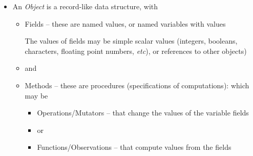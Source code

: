 \documentclass{ip3}
\begin{document}
\begin{foil}
\begin{itemize}
\item An \textit{Object} is a record-like data structure, with 
      \begin{itemize}
      \item Fields  -- these are named values, or named variables with values
            \begin{note}
                  The values of fields may be simple scalar values
                  (integers, booleans, characters, floating point numbers,
                  \textit{etc}), or references to other objects)
            \end{note}
      
      \item[]and  
      
      
      \item Methods -- these are procedures (specifications of computations): which may be 
           \begin{itemize}
           \item Operations/Mutators  -- that change the values of the variable  fields
           
           \item[]or
           
           
           \item Functions/Observations -- that compute values from the fields
            

\end{itemize}
\end{itemize}
\end{itemize}
\end{foil}
\end{document}
